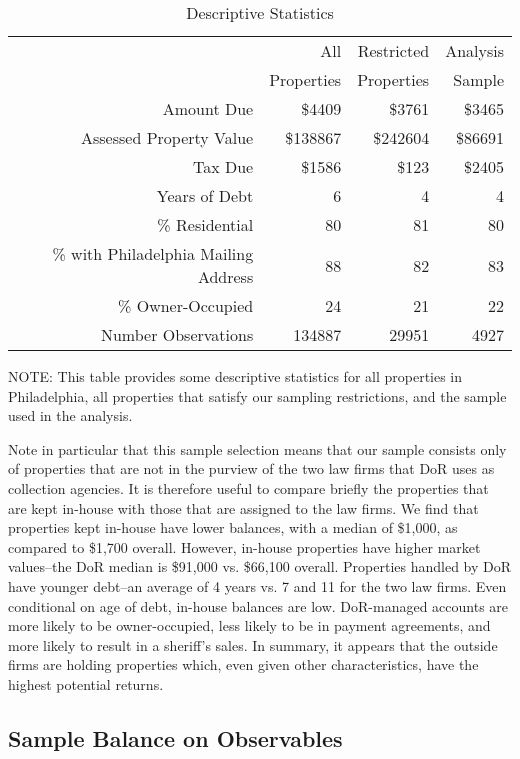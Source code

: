 \documentclass[12pt,titlepage]{article}
\begin{document}
\begin{table}[htb]
\begin{center}
\caption{Descriptive Statistics}\label{table:ds}
\begin{tabular}{|r|r|r|r|}
  \hline
   & All  & Restricted & Analysis  \\ 
 & Properties & Properties &  Sample \\ 
  \hline
Amount Due & \$4409 & \$3761 & \$3465 \\ 
  Assessed Property Value & \$138867 & \$242604 & \$86691 \\ 
  Tax Due & \$1586 & \$123 & \$2405 \\ 
  Years of Debt & 6 & 4 & 4 \\ 
  \% Residential & 80 & 81 & 80 \\ 
  \% with Philadelphia Mailing Address & 88 & 82 & 83 \\ 
  \% Owner-Occupied & 24 & 21 & 22 \\ 
  Number Observations & 134887 & 29951 & 4927 \\ 
   \hline
\end{tabular}
\end{center}
NOTE: This table provides some descriptive statistics for all
properties in Philadelphia, all properties that satisfy our sampling
restrictions, and the sample used in the analysis.
\end{table}

Note in particular that this sample selection means that our sample
consists only of properties that are not in the purview of the two law
firms that DoR uses as collection agencies. It is therefore useful to
compare briefly the properties that are kept in-house with those that
are assigned to the law firms. We find that properties kept in-house
have lower balances, with a median of \$1,000, as compared to \$1,700
overall. However, in-house properties have higher market values--the
DoR median is \$91,000 vs. \$66,100 overall. Properties handled by DoR
have younger debt--an average of 4 years vs. 7 and 11 for the two law
firms.  Even conditional on age of debt, in-house balances are low.
DoR-managed accounts are more likely to be owner-occupied, less likely
to be in payment agreements, and more likely to result in a sheriff's
sales. In summary, it appears that the outside firms are holding
properties which, even given other characteristics, have the highest
potential returns.

\subsection{Sample Balance on Observables}
\end{document}

